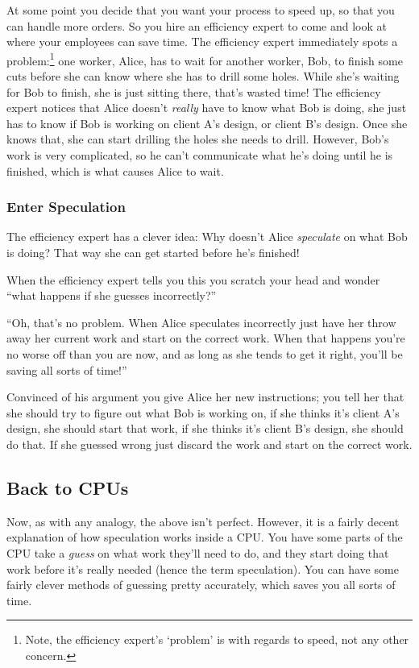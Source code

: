 \documentclass{article}
\begin{document}
At some point you decide that you want your process to speed up, so that you
can handle more orders. So you hire an efficiency expert to come and look at
where your employees can save time. The efficiency expert immediately spots a
problem:\footnote{Note, the efficiency expert's `problem' is with regards to
speed, not any other concern.} one worker, Alice, has to wait for another
worker, Bob, to finish some cuts before she can know where she has to drill
some holes. While she's waiting for Bob to finish, she is just sitting there,
that's wasted time!  The efficiency expert notices that Alice doesn't
\emph{really} have to know what Bob is doing, she just has to know if Bob is
working on client A's design, or client B's design. Once she knows that, she
can start drilling the holes she needs to drill. However, Bob's work is very
complicated, so he can't communicate what he's doing until he is finished,
which is what causes Alice to wait.

\subsubsection*{Enter Speculation}

The efficiency expert has a clever idea: Why doesn't Alice \emph{speculate}
on what Bob is doing? That way she can get started before he's finished!

When the efficiency expert tells you this you scratch your head and wonder
``what happens if she guesses incorrectly?''

``Oh, that's no problem. When Alice speculates incorrectly just have her throw
away her current work and start on the correct work. When that happens you're
no worse off than you are now, and as long as she tends to get it right, you'll
be saving all sorts of time!''

Convinced of his argument you give Alice her new instructions; you tell her
that she should try to figure out what Bob is working on, if she thinks it's
client A's design, she should start that work, if she thinks it's client B's
design, she should do that. If she guessed wrong just discard the work and
start on the correct work.


\subsection*{Back to CPUs}

Now, as with any analogy, the above isn't perfect. However, it is a fairly
decent explanation of how speculation works inside a CPU. You have some parts
of the CPU take a \emph{guess} on what work they'll need to do, and they start
doing that work before it's really needed (hence the term speculation). You can
have some fairly clever methods of guessing pretty accurately, which saves you
all sorts of time.
\end{document}
